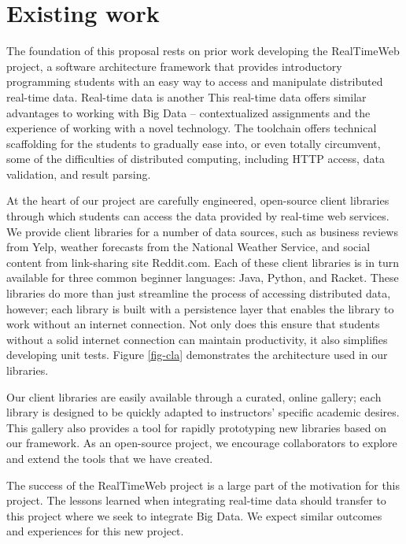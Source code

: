 \section{Existing work}

The foundation of this proposal rests on prior work developing the RealTimeWeb project, a software architecture framework that provides introductory programming students with an easy way to access and manipulate distributed real-time data\cite{bart-transforming}.
Real-time data is another 
This real-time data offers similar advantages to working with Big Data -- contextualized assignments and the experience of working with a novel technology.
The toolchain offers technical scaffolding for the students to gradually ease into, or even totally circumvent, some of the difficulties of distributed computing, including HTTP access, data validation, and result parsing.

At the heart of our project are carefully engineered, open-source client libraries through which students can access the data provided by real-time web services.
We provide client libraries for a number of data sources, such as business reviews from Yelp, weather forecasts from the National Weather Service, and social content from link-sharing site Reddit.com.
Each of these client libraries is in turn available for three common beginner languages: Java, Python, and Racket. 
These libraries do more than just streamline the process of accessing distributed data, however; each library is built with a persistence layer that enables the library to work without an internet connection.
Not only does this ensure that students without a solid internet connection can maintain productivity, it also simplifies developing unit tests. 
Figure \ref{fig-cla} demonstrates the architecture used in our libraries.

Our client libraries are easily available through a curated, online gallery; each library is designed to be quickly adapted to instructors' specific academic desires. 
This gallery also provides a tool for rapidly prototyping new libraries based on our framework.
As an open-source project, we encourage collaborators to explore and extend the tools that we have created.

The success of the RealTimeWeb project is a large part of the motivation for this project.
The lessons learned when integrating real-time data should transfer to this project where we seek to integrate Big Data.
We expect similar outcomes and experiences for this new project.


